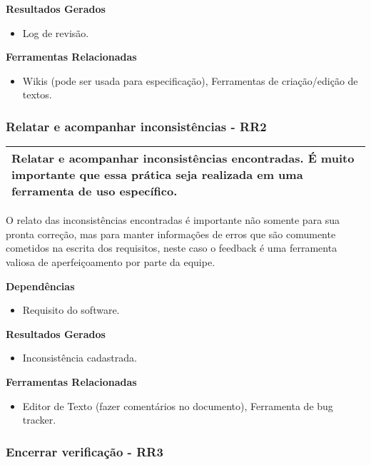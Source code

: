 \textbf{Resultados Gerados}
\begin{itemize}
    \item Log de revisão.
\end{itemize}

\textbf{Ferramentas Relacionadas}
\begin{itemize}
    \item Wikis (pode ser usada para especificação), Ferramentas de criação/edição de textos.
\end{itemize}

\subsubsection{Relatar e acompanhar inconsistências - RR2}
\label{sec:rr2}

\begin{table}[!ht]
\centering
\begin{tabular}{|p{130mm}|}
\hline
Relatar e acompanhar inconsistências encontradas. É muito importante que essa prática seja realizada em uma ferramenta de uso específico. \\ 
\hline
\end{tabular}
\end{table}

O relato das inconsistências encontradas é importante não somente para sua pronta correção, mas para manter informações de erros que são comumente cometidos na escrita dos requisitos, neste caso o feedback é uma ferramenta valiosa de aperfeiçoamento por parte da equipe.

\textbf{Dependências}
\begin{itemize}
    \item Requisito do software.
\end{itemize}

\textbf{Resultados Gerados}
\begin{itemize}
    \item Inconsistência cadastrada.
\end{itemize}

\textbf{Ferramentas Relacionadas}
\begin{itemize}
    \item  Editor de Texto (fazer comentários no documento), Ferramenta de bug tracker.
\end{itemize}

\subsubsection{Encerrar verificação - RR3}
\label{sec:rr3}

